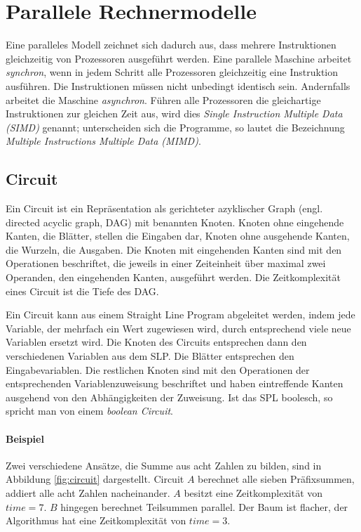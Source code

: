 \section{Parallele Rechnermodelle}
Eine paralleles Modell zeichnet sich dadurch aus, dass mehrere Instruktionen
gleichzeitig von Prozessoren ausgeführt werden.
Eine parallele Maschine arbeitet \emph{synchron}, wenn in jedem Schritt alle
Prozessoren gleichzeitig eine Instruktion ausführen.
Die Instruktionen müssen nicht unbedingt identisch sein.
Andernfalls arbeitet die Maschine \emph{asynchron}.
Führen alle Prozessoren die gleichartige Instruktionen zur gleichen Zeit aus,
wird dies \emph{Single Instruction Multiple Data (SIMD)} genannt; unterscheiden
sich die Programme, so lautet die Bezeichnung
\emph{Multiple Instructions Multiple Data (MIMD)}.

\subsection{Circuit}
Ein Circuit ist ein Repräsentation als gerichteter azyklischer Graph
(engl. directed acyclic graph, DAG) mit benannten Knoten.
Knoten ohne eingehende Kanten, die Blätter, stellen die Eingaben dar, Knoten
ohne ausgehende Kanten, die Wurzeln, die Ausgaben.
Die Knoten mit eingehenden Kanten sind mit den Operationen beschriftet, die
jeweils in einer Zeiteinheit über maximal zwei Operanden, den eingehenden
Kanten, ausgeführt werden.
Die Zeitkomplexität eines Circuit ist die Tiefe des DAG.

Ein Circuit kann aus einem Straight Line Program abgeleitet werden, indem jede
Variable, der mehrfach ein Wert zugewiesen wird, durch entsprechend viele neue
Variablen ersetzt wird.
Die Knoten des Circuits entsprechen dann den verschiedenen Variablen aus dem
SLP.
Die Blätter entsprechen den Eingabevariablen.
Die restlichen Knoten sind mit den Operationen der entsprechenden
Variablenzuweisung beschriftet und haben eintreffende Kanten ausgehend von den
Abhängigkeiten der Zuweisung.
Ist das SPL boolesch, so spricht man von einem \emph{boolean Circuit}.
\cite[S.7]{jaja}\cite[S.11f.]{reif}

\paragraph{Beispiel}
Zwei verschiedene Ansätze, die Summe aus acht Zahlen zu bilden, sind in
Abbildung \ref{fig:circuit} dargestellt.
Circuit $A$ berechnet alle sieben Präfixsummen, addiert alle acht Zahlen
nacheinander.
$A$ besitzt eine Zeitkomplexität von $time = 7$.
$B$ hingegen berechnet Teilsummen parallel.
Der Baum ist flacher, der Algorithmus hat eine Zeitkomplexität von $time = 3$.

